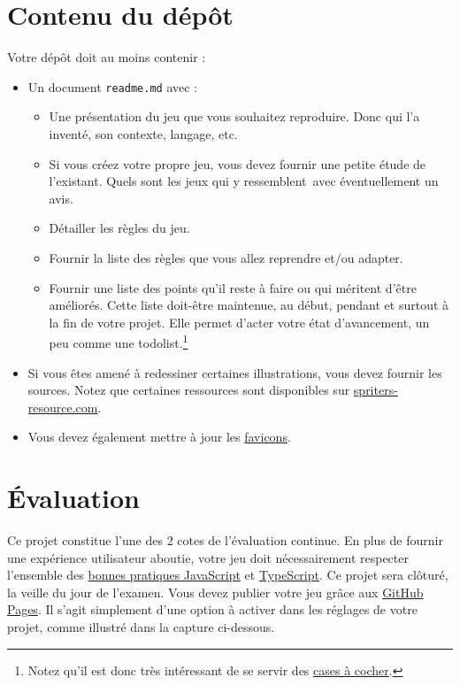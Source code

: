 \clearpage
\section{Contenu du dépôt}
\label{La documentation}

Votre dépôt doit au moins contenir :
\begin{itemize}
  \item Un document \verb!readme.md! avec :
        \begin{itemize}
          \item Une présentation du jeu que vous souhaitez reproduire. Donc qui l'a inventé, son contexte, langage, etc.
          \item Si vous créez votre propre jeu, vous devez fournir une petite étude de l'existant. Quels sont les jeux qui y ressemblent~avec éventuellement un avis.
          \item Détailler les règles du jeu.
          \item Fournir la liste des règles que vous allez reprendre et/ou adapter.
          \item Fournir une liste des points qu'il reste à faire ou qui méritent d'être améliorés. Cette liste doit-être maintenue, au début, pendant et surtout à la fin de votre projet. Elle permet d'acter votre état d'avancement, un peu comme une todolist.\footnote{Notez qu'il est donc très intéressant de se servir des \href{https://stackoverflow.com/questions/47344571/how-to-draw-checkbox-or-tick-mark-in-github-markdown-table}{cases à cocher}.}
        \end{itemize}
  \item Si vous êtes amené à redessiner certaines illustrations, vous devez fournir les sources. Notez que certaines ressources sont disponibles sur \href{https://www.spriters-resource.com}{spriters-resource.com}.
  \item Vous devez également mettre à jour les \href{https://realfavicongenerator.net}{favicons}.
\end{itemize}

\section{Évaluation}

Ce projet constitue l'une des 2 cotes de l'évaluation continue. En plus de fournir une expérience utilisateur aboutie, votre jeu doit nécessairement respecter l'ensemble des \href{https://github.com/hepl-dcc/dcc-guidelines}{bonnes pratiques JavaScript} et \href{https://github.com/hepl-mmi/mmi-guidelines}{TypeScript}.
Ce projet sera clôturé, la veille du jour de l'examen. Vous devez publier votre jeu grâce aux \href{https://docs.github.com/en/pages/getting-started-with-github-pages/configuring-a-publishing-source-for-your-github-pages-site}{GitHub Pages}. Il s'agit simplement d'une option à activer dans les réglages de votre projet, comme illustré dans la capture ci-dessous.

